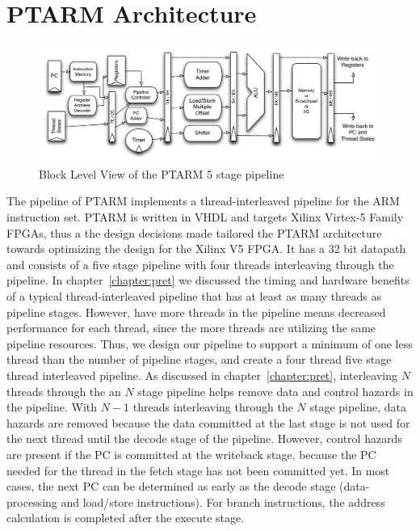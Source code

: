\section{PTARM Architecture}
\begin{figure}
  \vspace{-20pt}
  \begin{center}
    \includegraphics[scale=.6]{figs/ptarm_pipeline_five_stage}
  \end{center}
  \vspace{-20pt}
  \caption{Block Level View of the PTARM 5 stage pipeline}
  \label{fig:ptarm_pipeline_five_stage}
\end{figure}

The pipeline of PTARM implements a thread-interleaved pipeline for the ARM instruction set.
PTARM is written in VHDL and targets Xilinx Virtex-5 Family FPGAs, thus a the design decisions made tailored the PTARM architecture towards optimizing the design for the Xilinx V5 FPGA.
It has a 32 bit datapath and consists of a five stage pipeline with four threads interleaving through the pipeline. 
In chapter~\ref{chapter:pret} we discussed the timing and hardware benefits of a typical thread-interleaved pipeline that has at least as many threads as pipeline stages. 
However, have more threads in the pipeline means decreased performance for each thread, since the more threads are utilizing the same pipeline resources. 
Thus, we design our pipeline to support a minimum of one less thread than the number of pipeline stages, and create a four thread five stage thread interleaved pipeline. 
As discussed in chapter~\ref{chapter:pret}, interleaving $N$ threads through the an $N$ stage pipeline helps remove data and control hazards in the pipeline. 
With $N-1$ threads interleaving through the $N$ stage pipeline, data hazards are removed because the data committed at the last stage is not used for the next thread until the decode stage of the pipeline. 
However, control hazards are present if the PC is committed at the writeback stage, because the PC needed for the thread in the fetch stage has not been committed yet.
In most cases, the next PC can be determined as early as the decode stage (data-processing and load/store instructions).
For branch instructions, the address calculation is completed after the execute stage. 
 
